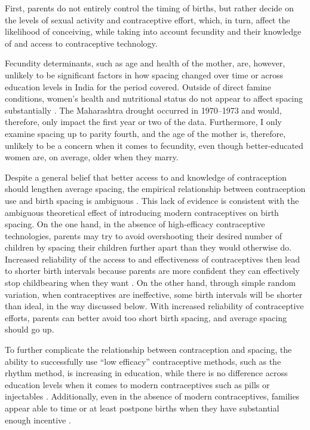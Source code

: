 \documentclass[12pt,letterpaper]{article}
\begin{document}
First, parents do not entirely control the timing of births, but rather decide on 
the levels of sexual activity and contraceptive effort, which, in turn, affect the 
likelihood of conceiving, while taking into account fecundity and their knowledge 
of and access to contraceptive technology.

Fecundity determinants, such as age and health of the mother, are, however, unlikely 
to be significant factors in how spacing changed over time or across education levels 
in India for the period covered.
Outside of direct famine conditions, women's health and nutritional status do not 
appear to affect spacing substantially \citep{Huffman1987,John1987,lindstrom99}.
The Maharashtra drought occurred in 1970--1973 and would, therefore, only impact the first
year or two of the data.
Furthermore, I only examine spacing up to parity fourth, and the age of the mother is,
therefore, unlikely to be a concern when it comes to fecundity, even though 
better-educated women are, on average, older when they marry. 

Despite a general belief that better access to and knowledge of contraception 
should lengthen average spacing, the empirical relationship between contraception 
use and birth spacing is ambiguous 
\citep{Tulasidhar1993,Whitworth2002,Bhalotra2008,Yeakey2009,Kim2010,Soest2018}.
This lack of evidence is consistent with the ambiguous theoretical effect of introducing 
modern contraceptives on birth spacing.
On the one hand, in the absence of high-efficacy contraceptive technologies, parents may 
try to avoid overshooting their desired number of children by spacing their children 
further apart than they would otherwise do.
Increased reliability of the access to and effectiveness of contraceptives then lead to 
shorter birth intervals because parents are more confident they can effectively
stop childbearing when they want \citep{Keyfitz1971,Heckman1976}.
On the other hand, through simple random variation, when contraceptives are ineffective, 
some birth intervals will be shorter than ideal, in the way discussed below.
With increased reliability of contraceptive efforts, parents can better avoid too short 
birth spacing, and average spacing should go up.

To further complicate the relationship between contraception and spacing, the ability 
to successfully use ``low efficacy'' contraceptive methods, such as the rhythm method, 
is increasing in education, while there is no difference across education levels 
when it comes to modern contraceptives such as pills or injectables \citep{Rosenzweig1989}.
Additionally, even in the absence of modern contraceptives, families appear able to 
time or at least postpone births when they have substantial enough incentive 
\citep{Jayachandran2011,Alam2018}.
\end{document}
